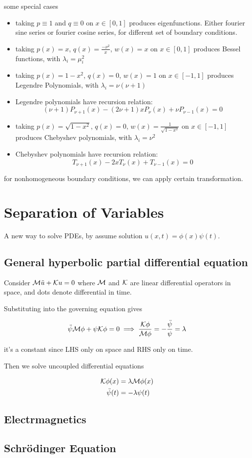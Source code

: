 \documentclass{article}
\begin{document}
\begin{remark}
    some special cases
    \begin{itemize}
        \item taking \(p\equiv 1\) and \(q\equiv 0\) on \(x\in[0,1]\)  produces eigenfunctions. Either fourier sine series or fourier cosine series, for different set of boundary conditions.
        \item taking \(p(x)=x\), \(q(x)=\frac{-\nu^2}{x}\), \(w(x)=x\) on \(x\in[0,1]\) produces Bessel functions, with \(\lambda_i=\mu_i^2\) 
        \item taking \(p(x)=1-x^2\), \(q(x)=0\), \(w(x)=1\) on \(x\in[-1,1]\) produces Legendre Polynomials, with \(\lambda_i=\nu(\nu+1)\)
        \item Legendre polynomials have recursion relation: 
        \[(\nu+1)P_{\nu+1}(x)-(2\nu+1)xP_\nu(x)+\nu P_{\nu-1}(x)=0\]
        \item taking \(p(x)=\sqrt{1-x^2}\), \(q(x)=0\), \(w(x)=\frac{1}{\sqrt{1-x^2}}\) on \(x\in[-1,1]\) produces Chebyshev polynomials, with \(\lambda_i=\nu^2\)
        \item Chebyshev polynomials have recursion relation:
        \[T_{\nu+1}(x)-2xT_\nu(x)+T_{\nu-1}(x)=0\]
    \end{itemize}
\end{remark}

\begin{remark}
    for nonhomogeneous boundary conditions, we can apply certain transformation.
\end{remark}

\section{Separation of Variables}

A new way to solve PDEs, by assume solution \(u(x,t)=\phi(x)\psi(t)\).

\subsection{General hyperbolic partial differential equation}

Consider \(\mathcal{M} \ddot u+\mathcal{K} u=0\) where \(\mathcal{M}\) and \(\mathcal{K}\) are linear differential operators in space, and dots denote differential in time.

Substituting into the governing equation gives

\[\ddot \psi \mathcal{M} \phi + \psi\mathcal{K} \phi=0\implies \frac{\mathcal{K} \phi}{\mathcal{M} \phi}=-\frac{\ddot\psi}{\psi}=\lambda\]

it's a constant since LHS only on space and RHS only on time.

Then we solve uncoupled differential equations

\begin{align*}
    \mathcal{K} \phi(x) &=\lambda\mathcal{M} \phi(x)\\
    \ddot\psi(t) &= -\lambda \psi(t)
\end{align*}
\subsection{Electrmagnetics}
\subsection{Schr\"odinger Equation}
\end{document}
